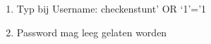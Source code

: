 \begin{enumerate}
  \item Typ bij Username: checkenstunt' OR `1'='1
  \item Password mag leeg gelaten worden
\end{enumerate}